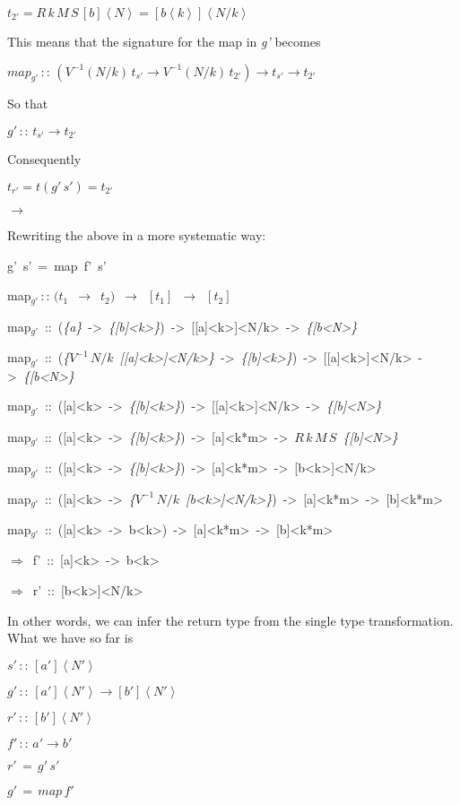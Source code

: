 \documentclass{article}
\newenvironment{lyxcode}
{\par\begin{list}{}{
\setlength{\rightmargin}{\leftmargin}
\setlength{\listparindent}{0pt}\raggedright
\setlength{\itemsep}{0pt}
\setlength{\parsep}{0pt}
\normalfont\ttfamily}\item[]}
{\end{list}}
\begin{document}
$t_{2'}=R\, k\, M\, S\,[b]\left\langle N\right\rangle =[b\left\langle k\right\rangle ]\left\langle N/k\right\rangle $ 

This means that the signature for the map in \emph{g'} becomes
\begin{lyxcode}
$map_{g'}\,::\,\left(V^{-1}(N/k)\, t_{s'}\rightarrow V^{-1}(N/k)\, t_{2'}\right)\rightarrow t_{s'}\rightarrow t_{2'}$
\end{lyxcode}
So that
\begin{lyxcode}
$g'\,::\, t_{s'}\rightarrow t_{2'}$
\end{lyxcode}
Consequently
\begin{lyxcode}
$t_{r'}=t(g'\, s')=t_{2'}$

$\rightarrow$
\end{lyxcode}
Rewriting the above in a more systematic way:
\begin{lyxcode}
g'~s'~=~map~f'~s'

map$_{g'}$$\,::\,(t_{1}$~$\rightarrow$~$t_{2}$$)$~$\rightarrow$~$[t_{1}]$~$\rightarrow$~$[t_{2}]$

map$_{g'}$~::~(\emph{\{a\}}~->~\emph{\{{[}b{]}<k>\}})~->~{[}{[}a{]}<k>{]}<N/k>~->~\emph{\{{[}b<N>\}}

map$_{g'}$~::~(\emph{\{}$V^{-1}\, N/k$~\emph{{[}{[}a{]}<k>{]}<N/k>\}}~->~\emph{\{{[}b{]}<k>\}})~->~{[}{[}a{]}<k>{]}<N/k>~->~\emph{\{{[}b<N>\}}

map$_{g'}$~::~({[}a{]}<k>~->~\emph{\{{[}b{]}<k>\}})~->~{[}{[}a{]}<k>{]}<N/k>~->~\emph{\{{[}b{]}<N>\}}

map$_{g'}$~::~({[}a{]}<k>~->~\emph{\{{[}b{]}<k>\}})~->~{[}a{]}<k{*}m>~->~$R\, k\, M\, S$~\emph{\{{[}b{]}<N>\}}

map$_{g'}$~::~({[}a{]}<k>~->~\emph{\{{[}b{]}<k>\}})~->~{[}a{]}<k{*}m>~->~{[}b<k>{]}<N/k>

map$_{g'}$~::~({[}a{]}<k>~->~\emph{\{}$V^{-1}\, N/k$~\emph{{[}b<k>{]}<N/k>\}})~->~{[}a{]}<k{*}m>~->~{[}b{]}<k{*}m>

map$_{g'}$~::~({[}a{]}<k>~->~b<k>)~->~{[}a{]}<k{*}m>~->~{[}b{]}<k{*}m>

$\Rightarrow$~f'~::~{[}a{]}<k>~->~b<k>

$\Rightarrow$~r'~::~{[}b<k>{]}<N/k>
\end{lyxcode}
In other words, we can infer the return type from the single type
transformation. What we have so far is
\begin{lyxcode}
$s'\,::\,[a']\left\langle N'\right\rangle $

$g'\,::\,[a']\left\langle N'\right\rangle \rightarrow[b']\left\langle N'\right\rangle $

$r'\,::\,[b']\left\langle N'\right\rangle $

$f'\,::\, a'\rightarrow b'$

$r'\,=\, g'\, s'$

$g'\,=\, map\, f'$
\end{lyxcode}
\end{document}
